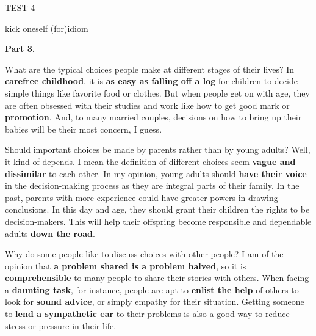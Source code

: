 \begin{glossarymc}[Cambridge 6]
\begin{test}{TEST 4}
\begin{VocabExplain}[Part 2]
            \begin{ExplainCard}{kick oneself (for)}{idiom}
            \end{ExplainCard}
        \end{VocabExplain}

    \noindent
    \textbf{Part 3.}
    \begin{qa}{What are the typical choices people make at different stages of their lives?}
    In \textbf{carefree childhood}, it is \textbf{as easy as falling off a log} for children to decide simple things like favorite food or clothes. But when people get on with age, they are often obsessed with their studies and work like how to get good mark or \textbf{promotion}. And, to many married couples, decisions on how to bring up their babies will be their most concern, I guess.
    \end{qa}

    \begin{qa}{Should important choices be made by parents rather than by young adults?}
    Well, it kind of depends. I mean the definition of different choices seem \textbf{vague and dissimilar} to each other. In my opinion, young adults should \textbf{have their voice} in the decision-making process as they are integral parts of their family. In the past, parents with more experience could have greater powers in drawing conclusions. In this day and age, they should grant their children the rights to be decision-makers. This will help their offspring become responsible and dependable adults \textbf{down the road}.
    \end{qa}

    \begin{qa}{Why do some people like to discuss choices with other people?}
    I am of the opinion that \textbf{a problem shared is a problem halved}, so it is \textbf{comprehensible} to many people to share their stories with others. When facing a \textbf{daunting task}, for instance, people are apt to \textbf{enlist the help} of others to look for \textbf{sound advice}, or simply empathy for their situation. Getting someone to \textbf{lend a sympathetic ear} to their problems is also a good way to reduce stress or pressure in their life.
    \end{qa}


\end{test}
\end{glossarymc}
